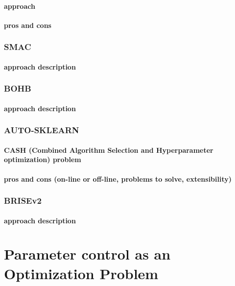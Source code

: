\paragraph{approach} \cite{irace:lopez2016irace}
\paragraph{pros and cons}

\subsubsection{SMAC}
\paragraph{approach description}

\subsubsection{BOHB}
\paragraph{approach description}

\subsubsection{AUTO-SKLEARN}
\paragraph{CASH (Combined Algorithm Selection and Hyperparameter optimization) problem}
\paragraph{pros and cons (on-line or off-line, problems to solve, extensibility)}\cite{autosklearn:feurer2015efficient}

\subsubsection{BRISEv2}
\paragraph{approach description}


\section{Parameter control as an Optimization Problem}\label{bg: parameter control}
